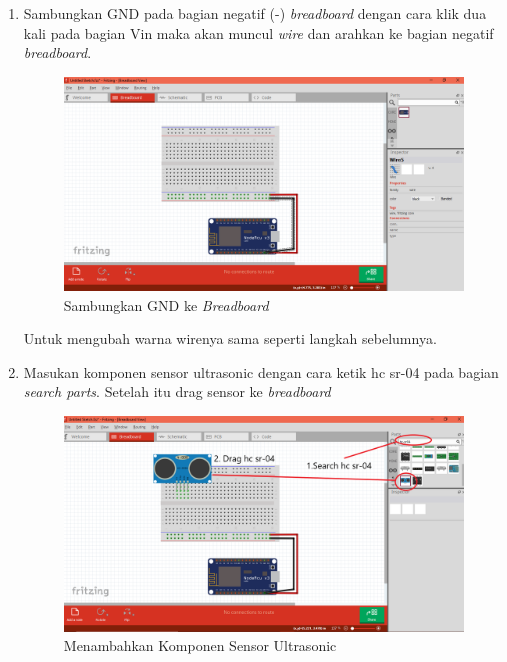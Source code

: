 \begin{enumerate}
    \item Sambungkan GND pada bagian negatif (-) \textit{breadboard} dengan cara klik dua kali pada bagian Vin maka akan muncul \textit{wire} dan arahkan ke bagian negatif \textit{breadboard}.
    \begin{figure}[H]
    \centering
    \includegraphics[width=1.1\textwidth]{figures/tutor6.png}
    \caption{Sambungkan GND ke \textit{Breadboard} }
    \label{print}
    \end{figure}
    Untuk mengubah warna wirenya sama seperti langkah sebelumnya.
    \item  Masukan komponen sensor ultrasonic dengan cara ketik hc sr-04 pada bagian \textit{search parts}. Setelah itu drag sensor ke \textit{breadboard}
    \begin{figure}[H]
    \centering
    \includegraphics[width=1.1\textwidth]{figures/tutor7.png}
    \caption{Menambahkan Komponen Sensor Ultrasonic }
    \label{print}
    \end{figure}
    

\end{enumerate}
